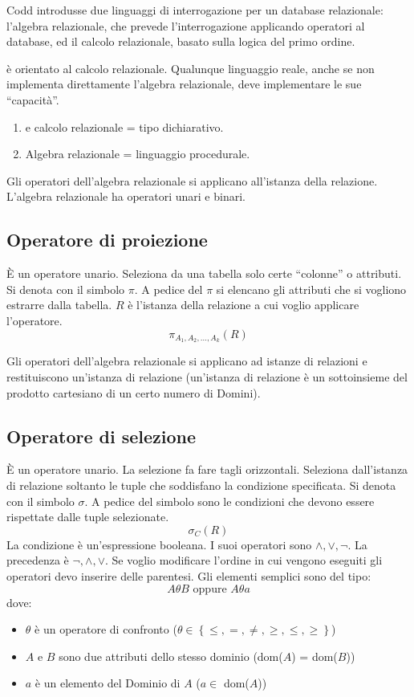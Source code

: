 Codd introdusse due linguaggi di interrogazione per un database relazionale: l'algebra relazionale, che prevede l'interrogazione applicando operatori al database, ed il calcolo relazionale, basato sulla logica del primo ordine. 

 \`e orientato al calcolo relazionale. Qualunque linguaggio reale, anche se non implementa direttamente l'algebra relazionale, deve implementare le sue ``capacit\`a''.

\begin{enumerate}
    \item {} e calcolo relazionale = tipo dichiarativo.
    \item Algebra relazionale = linguaggio procedurale.
\end{enumerate}

Gli operatori dell'algebra relazionale si applicano all'istanza della relazione. L'algebra relazionale ha operatori unari e binari.

\subsection{Operatore di proiezione}

\`E un operatore unario. Seleziona da una tabella solo certe ``colonne'' o attributi. Si denota con il simbolo $\pi$. A pedice del $\pi$ si elencano gli attributi che si vogliono estrarre dalla tabella. $R$ \`e l'istanza della relazione a cui voglio applicare l'operatore.
\[
\pi_{A_1, A_2, \dots, A_k} (R)
\]

Gli operatori dell'algebra relazionale si applicano ad istanze di relazioni e restituiscono un'istanza di relazione (un'istanza di relazione \`e un sottoinsieme del prodotto cartesiano di un certo numero di Domini).

\subsection{Operatore di selezione}

\`E un operatore unario. La selezione fa fare tagli orizzontali. Seleziona dall'istanza di relazione soltanto le tuple che soddisfano la condizione specificata. Si denota con il simbolo $\sigma$. A pedice del simbolo sono le condizioni che devono essere rispettate dalle tuple selezionate.
\[
\sigma_{C}(R)
\]
La condizione \`e un'espressione booleana. I suoi operatori sono $\land, \lor, \neg$. La precedenza \`e $\neg, \land, \lor$. Se voglio modificare l'ordine in cui vengono eseguiti gli operatori devo inserire delle parentesi. Gli elementi semplici sono del tipo:
\[
A \theta B
\text{ oppure }
A \theta a
\]
dove:
\begin{itemize}
    \item $\theta$ \`e un operatore di confronto ($\theta \in \left\{  \le, =, \neq, \ge, \leq, \geq \right\}$)
    \item $A$ e $B$ sono due attributi dello stesso dominio (dom($A$) = dom($B$))
    \item $a$ \`e un elemento del Dominio di $A$ ($a \in$ dom($A$))
\end{itemize}

